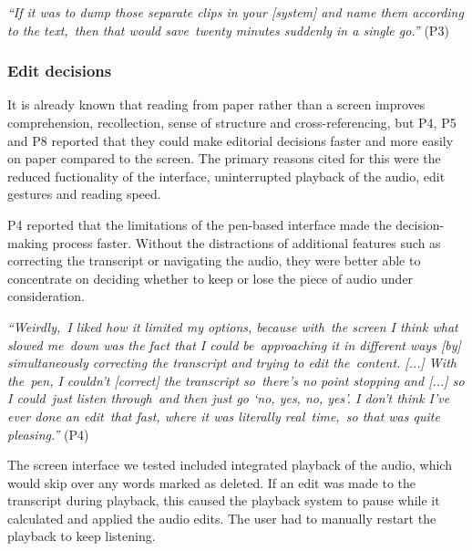 \textit{``If it was to dump those separate clips in your [system] and name them according to the text, then that would
save twenty minutes suddenly in a single go.''} (P3)


\subsubsection{Edit decisions}\label{sec:paper-edit-decisions}

It is already known that reading from paper rather than a screen improves comprehension, recollection, sense of
structure and cross-referencing, but P4, P5 and P8 reported that they could make editorial decisions faster and more
easily on paper compared to the screen. The primary reasons cited for this were the reduced fuctionality of the
interface, uninterrupted playback of the audio, edit gestures and reading speed.

P4 reported that the limitations of the pen-based interface made the decision-making process faster. Without the
distractions of additional features such as correcting the transcript or navigating the audio, they were better able to
concentrate on deciding whether to keep or lose the piece of audio under consideration.

\textit{``Weirdly, I liked how it limited my options, because with the screen I think what slowed me down
  was the fact that I could be approaching it in different ways [by]
  simultaneously correcting the transcript and trying to edit the content. [...]
  With the pen, I couldn't [correct] the transcript so there's no point stopping and [...]
  so I could just listen through and then just go `no, yes, no, yes'.
I don't think I've ever done an edit that fast, where it was literally real time, so that was quite pleasing.''} (P4)

The screen interface we tested included integrated playback of the audio, which would skip over any words marked as
deleted.  If an edit was made to the transcript during playback, this caused the playback system to pause while it
calculated and applied the audio edits.  The user had to manually restart the playback to keep listening.

